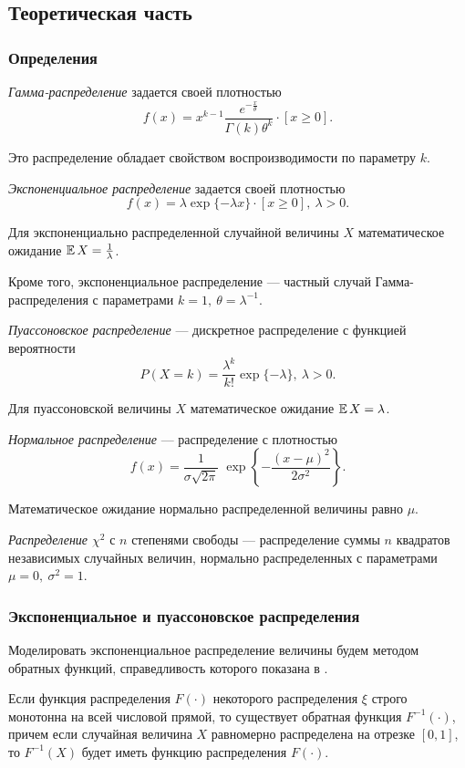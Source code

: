 \documentclass[12pt, a4paper]{article}
\begin{document}
\subsection{Теоретическая часть}
\subsubsection{Определения}
\begin{df}
\textit{Гамма-распределение} задается своей плотностью 
\[f(x) = x^{k-1} \frac{e^{-\frac{x}{\theta}}}{\Gamma(k)\theta^k}\cdot \left[ x \geqslant 0 \right].\]
\end{df}
Это распределение обладает свойством воспроизводимости по параметру $k$.
\begin{df}
\textit{Экспоненциальное распределение} задается своей плотностью 
\[f(x) = \lambda\exp{ \{-\lambda x\} }\cdot \left[ x \geqslant 0 \right],\ \lambda>0.\]
\end{df}
Для экспоненциально распределенной случайной величины $X$ математическое ожидание $\operatorname{\mathbb{E}} X = \frac 1\lambda$.

Кроме того, экспоненциальное распределение --- частный случай Гамма-распределения с параметрами $k=1,\  \theta = \lambda^{-1}$.
\begin{df}
\textit{Пуассоновское распределение} --- дискретное распределение с функцией вероятности 
\[P(X = k) = \frac{\lambda^k}{k!}\exp{ \{ -\lambda\} },\ \lambda>0.\]
\end{df}
Для пуассоновской величины $X$ математическое ожидание $\operatorname{\mathbb{E}} X = \lambda$.
\begin{df}
\textit{Нормальное распределение} --- распределение с плотностью
\[f(x) = \frac1{\sigma\sqrt{2\pi}}\; \exp\left\{ -\frac{\left(x-\mu\right)^2}{2\sigma^2} \right\}. \]
\end{df}
Математическое ожидание нормально распределенной величины равно $\mu$.

\begin{df}
\textit{Распределение $\chi^2$} с $n$ степенями свободы --- распределение суммы $n$ квадратов независимых случайных величин, нормально распределенных с параметрами $\mu = 0,\ \sigma^2 = 1$.
\end{df}

\subsubsection{Экспоненциальное и пуассоновское распределения}
Моделировать экспоненциальное распределение величины будем методом обратных функций, справедливость которого показана в \cite{Ivchenko_Medvedev}.
\begin{stm}
Если функция распределения $F(\cdot)$ некоторого распределения $\xi$ строго монотонна на всей числовой прямой, то существует обратная функция $F^{-1}(\cdot)$, причем если случайная величина $X$ равномерно распределена на отрезке $\left[0,1\right]$, то $F^{-1}(X)$ будет иметь функцию распределения $F(\cdot)$.
\end{stm}
\end{document}
